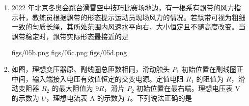 \documentclass[\gkver]{gaokaozhenti}
\begin{document}
\begin{enumerate}
{联立解得

$v_{2} = \frac{2}{15}v_{0}$

可得

$v_{1} = v_{0} > v_{2}$

碰撞后氢核的动量为

$p_{H} = mv_{1} = mv_{0}$

氮核的动量为

$p_{N} = 14mv_{2} = \frac{28mv_{0}}{15}$

可得

$p_{N} > p_{H}$

碰撞后氢核的动能为

$E_{kH} = \frac{1}{2}mv_{1}^{2} = \frac{1}{2}mv_{0}^{2}$

氮核的动能为

$E_{kN} = \frac{1}{2}\cdot 14mv_{2}^{2} = \frac{28mv_{0}^{2}}{225}$

可得 $E_{kH} > E_{kN}$。

故 B 正确，ACD 错误。

故选 B。
}

\item
2022 年北京冬奥会跳台滑雪空中技巧比赛场地边，有一根系有飘带的风力指示杆，教练员根据飘带的形态提示运动员现场风力的情况。若飘带可视为粗细一致的匀质长绳，其所处范围内风速水平向右、大小恒定且不随高度改变。当飘带稳定时，飘带实际形态最接近的是

{figs/05b.png}
{figs/05c.png}
{figs/05d.png}


\item
如图，理想变压器原、副线圈总匝数相同，滑动触头 $P_{1}$ 初始位置在副线圈正中间，输入端接入电压有效值恒定的交变电源。定值电阻 $R_{1}$ 的阻值为 $R$，滑动变阻器 $R_{2}$ 的最大阻值为 $9R$，滑片 $P_{2}$ 初始位置在最右端。理想电压表 V 的示数为 $U$，理想电流表 A 的示数为 $I$。下列说法正确的是


\end{enumerate}
\end{document}
